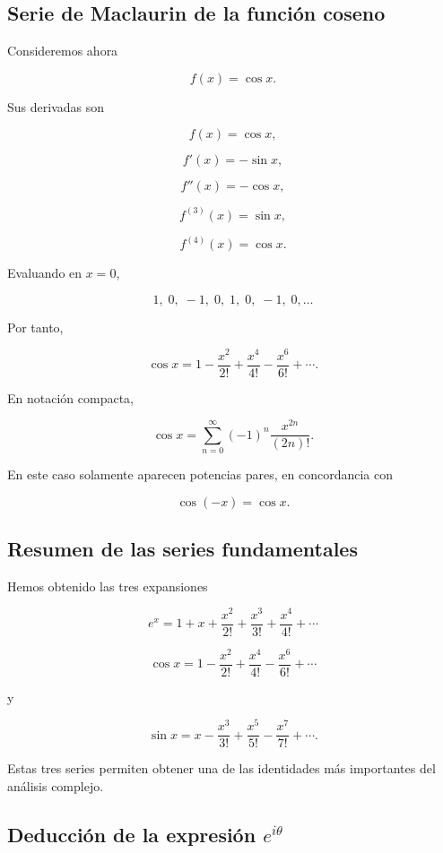 \documentclass[12pt]{article}
\begin{document}
\subsection{Serie de Maclaurin de la función coseno}

Consideremos ahora

\[
f(x)=\cos x.
\]

Sus derivadas son

\[
f(x)=\cos x,
\]

\[
f'(x)=-\sin x,
\]

\[
f''(x)=-\cos x,
\]

\[
f^{(3)}(x)=\sin x,
\]

\[
f^{(4)}(x)=\cos x.
\]

Evaluando en \(x=0\),

\[
1,\;0,\;-1,\;0,\;1,\;0,\;-1,\;0,\ldots
\]

Por tanto,

\[
\cos x
=
1
-\frac{x^2}{2!}
+\frac{x^4}{4!}
-\frac{x^6}{6!}
+\cdots.
\]

En notación compacta,

\[
\boxed{
\cos x
=
\sum_{n=0}^{\infty}
(-1)^n
\frac{x^{2n}}{(2n)!}.
}
\]

En este caso solamente aparecen potencias pares, en concordancia con

\[
\cos(-x)=\cos x.
\]


\subsection{Resumen de las series fundamentales}

Hemos obtenido las tres expansiones

\[
\boxed{
e^x
=
1+x+\frac{x^2}{2!}
+\frac{x^3}{3!}
+\frac{x^4}{4!}
+\cdots
}
\]

\[
\boxed{
\cos x
=
1-\frac{x^2}{2!}
+\frac{x^4}{4!}
-\frac{x^6}{6!}
+\cdots
}
\]

y

\[
\boxed{
\sin x
=
x-\frac{x^3}{3!}
+\frac{x^5}{5!}
-\frac{x^7}{7!}
+\cdots.
}
\]

Estas tres series permiten obtener una de las identidades más importantes
del análisis complejo.


\subsection{Deducción de la expresión \(e^{i\theta}\)}
\end{document}
